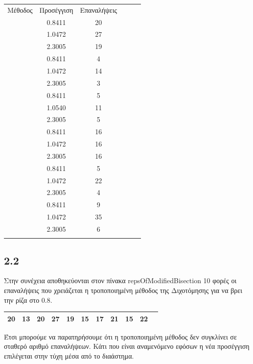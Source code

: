 \documentclass[a4paper,11pt]{article}
\begin{document}
\begin{flushleft}
\begin{center}
    \begin{tabular}{|c|c|c|c|c|c|}
        \hline
        Μέθοδος & Προσέγγιση & Επαναλήψεις\\ \Xhline{4\arrayrulewidth}
        \multirow{3}{*}{modifiedBisectionRoots} & 0.8411 & 20 \\ \cline{2-3} & 1.0472 & 27 \\ \cline{2-3} & 2.3005 & 19 \\ \Xhline{4\arrayrulewidth}
        \multirow{3}{*}{modifiedNewtonRoots} & 0.8411 & 4 \\ \cline{2-3} & 1.0472 & 14 \\ \cline{2-3} & 2.3005 & 3 \\ \Xhline{4\arrayrulewidth}
        \multirow{3}{*}{modifiedSecantRoots} & 0.8411 & 5 \\ \cline{2-3} & 1.0540 & 11 \\ \cline{2-3} & 2.3005 & 5 \\ \Xhline{4\arrayrulewidth}
        \multirow{3}{*}{bisectionRoots} & 0.8411 & 16 \\ \cline{2-3} & 1.0472 & 16 \\ \cline{2-3} & 2.3005 & 16 \\ \Xhline{4\arrayrulewidth}
        \multirow{3}{*}{newtonRoots} & 0.8411 & 5 \\ \cline{2-3} & 1.0472 & 22 \\ \cline{2-3} & 2.3005 & 4 \\ \Xhline{4\arrayrulewidth}
        \multirow{3}{*}{secantRoots} & 0.8411 & 9 \\ \cline{2-3} & 1.0472 & 35 \\ \cline{2-3} & 2.3005 & 6 \\ \Xhline{4\arrayrulewidth}
    \end{tabular}
\end{center}

\subsection*{2.2}    
Στην συνέχεια αποθηκεύονται στον πίνακα repsOfModifiedBisection 10 φορές οι επαναλήψεις που χρειάζεται η τροποποιημένη μέθοδος της Διχοτόμησης για να βρει την ρίζα στο 0.8.
\begin{center}
    \centering
    \begin{tabular}{|c|c|c|c|c|c|c|c|c|c|c|}
        \hline
        20 & 13 & 20 & 27 & 19 & 15 & 17 & 21 & 15 & 22 \\
        \hline
    \end{tabular}
\end{center}
Έτσι μπορούμε να παρατηρήσουμε ότι η τροποποιημένη μέθοδος δεν συγκλίνει σε σταθερό αριθμό επαναλήψεων. Κάτι που είναι αναμενόμενο εφόσων η νέα προσέγγιση επιλέγεται στην τύχη μέσα από το διαάστημα.


\end{flushleft}
\end{document}
